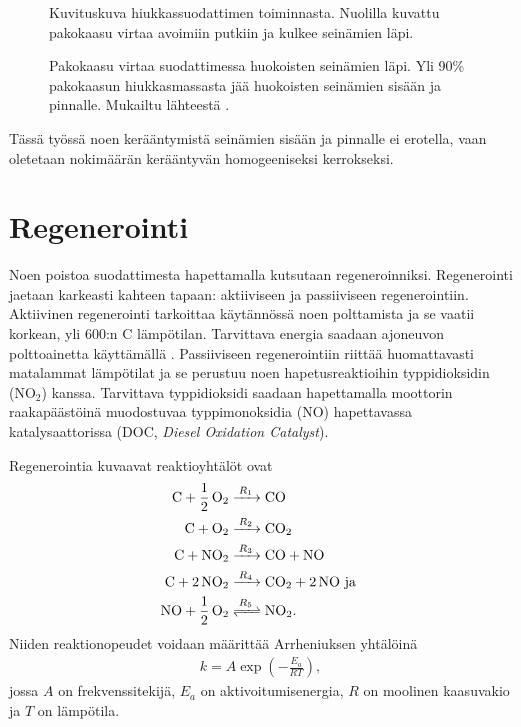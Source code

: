 \begin{figure}[H]
    \centering 
               {Kuvituskuva hiukkassuodattimen toiminnasta. Nuolilla kuvattu pakokaasu virtaa avoimiin putkiin ja kulkee seinämien läpi.}
    \caption{Pakokaasu virtaa suodattimessa huokoisten seinämien läpi. Yli 90\% pakokaasun hiukkasmassasta jää huokoisten seinämien sisään ja pinnalle. Mukailtu lähteestä \cite{dieselnet_dpf}.}
    \label{fig:wall-flow-dpf}
\end{figure}

Tässä työssä noen kerääntymistä seinämien sisään ja pinnalle ei erotella, vaan oletetaan nokimäärän kerääntyvän homogeeniseksi kerrokseksi.


\section{Regenerointi}
Noen poistoa suodattimesta hapettamalla kutsutaan regeneroinniksi. Regenerointi jaetaan karkeasti kahteen tapaan: aktiiviseen ja passiiviseen regenerointiin. 
Aktiivinen regenerointi tarkoittaa käytännössä noen polttamista ja se
vaatii korkean, yli 600:n \degree C lämpötilan. Tarvittava energia saadaan ajoneuvon polttoainetta käyttämällä \cite{dieselnet_dpf}. Passiiviseen regenerointiin riittää huomattavasti matalammat lämpötilat ja se perustuu noen hapetusreaktioihin typpidioksidin (NO\(_2\)) kanssa. Tarvittava typpidioksidi saadaan hapettamalla moottorin raakapäästöinä muodostuvaa typpimonoksidia (NO) hapettavassa katalysaattorissa (DOC, \emph{Diesel Oxidation Catalyst}).


Regenerointia kuvaavat reaktioyhtälöt ovat  
\begin{align}
    \ce{C + 1/2 O2 &->[$R_1$] CO }\label{req:regen_c2co}\\
    \ce{C + O2 &->[$R_2$] CO2}\label{req:regen_c2co2}\\
    \ce{C + NO2 &->[$R_3$] CO +  NO}  \\
    \ce{C + 2 NO2 &->[$R_4$] CO2 + 2 NO} \text{ ja }\\
    \ce{NO + 1/2 O2 &<=>[$R_5$] NO2}.
\end{align}
Niiden reaktionopeudet voidaan määrittää Arrheniuksen yhtälöinä \cite{LiuGuanlin2021Roio} \cite{Penghao_regen}
\begin{align}
    k =  A\exp\left({-\frac{E_a}{RT}}\right),
\end{align}
jossa \(A\) on frekvenssitekijä, \(E_a\) on aktivoitumisenergia, \(R\) on moolinen kaasuvakio ja \(T\) on lämpötila.


